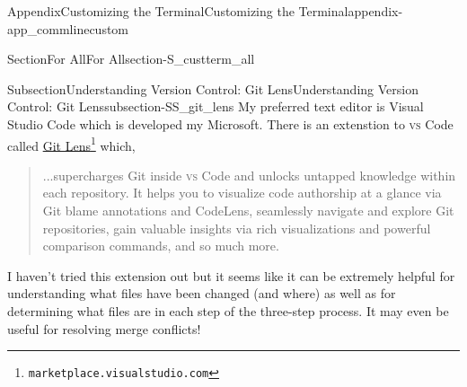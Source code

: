 \documentclass[twoside,10pt,]{book}
\newcommand{\initialism}[1]{\textsc{\MakeLowercase{#1}}}
\begin{document}
\begin{appendixptx}{Appendix}{Customizing the Terminal}{}{Customizing the Terminal}{}{}{appendix-app_commlinecustom}
\begin{sectionptx}{Section}{For All}{}{For All}{}{}{section-S_custterm_all}
\typeout{************************************************}
%
\begin{subsectionptx}{Subsection}{Understanding Version Control: Git Lens}{}{Understanding Version Control: Git Lens}{}{}{subsection-SS_git_lens}
%
%
My preferred text editor is Visual Studio Code which is developed my Microsoft. There is an extenstion to \initialism{VS} Code called \href{https://marketplace.visualstudio.com/items?itemName=eamodio.gitlens}{Git Lens}\footnote{\nolinkurl{marketplace.visualstudio.com}\label{fn-SS_git_lens-d-c}} which,%
\begin{quote}%
...supercharges Git inside \initialism{VS} Code and unlocks untapped knowledge within each repository. It helps you to visualize code authorship at a glance via Git blame annotations and CodeLens, seamlessly navigate and explore Git repositories, gain valuable insights via rich visualizations and powerful comparison commands, and so much more.%
\end{quote}
I haven't tried this extension out but it seems like it can be extremely helpful for understanding what files have been changed (and where) as well as for determining what files are in each step of the three-step process. It may even be useful for resolving merge conflicts!%
\end{subsectionptx}
\end{sectionptx}
\end{appendixptx}
%
%
\typeout{************************************************}
\typeout{************************************************}
%
\end{document}
